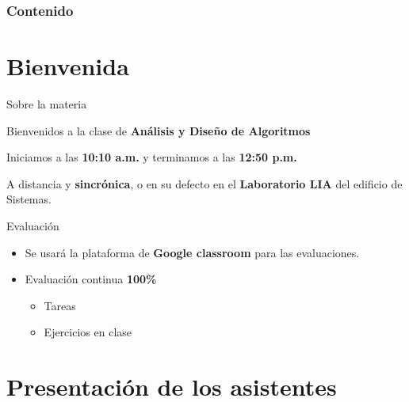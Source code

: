 \begin{frame}
    \frametitle{Contenido}
    \tableofcontents
\end{frame}

\section{Bienvenida}

\begin{frame}[c]{Sobre la materia}

  Bienvenidos a la clase de \textbf{Análisis y Diseño de Algoritmos}

  \vspace{\baselineskip}
  \begin{description}
    \pausa
    \item[Horario:] Iniciamos a las \textbf{10:10 a.m.} y terminamos a las
      \textbf{12:50 p.m.}
    \pausa
    \item[Modalidad:] A distancia y \textbf{sincrónica}, o en su defecto
      en el \textbf{Laboratorio LIA} del edificio de Sistemas.
  \end{description}
\end{frame}

\begin{frame}[c]{Evaluación}
  \begin{itemize}
    \item Se usará la plataforma de \textbf{Google classroom} para las
      evaluaciones.
    \pausa
    \item Evaluación continua \textbf{100\%}
    \pausa
    \begin{itemize}
      \item Tareas
      \pausa
      \item Ejercicios en clase
    \end{itemize}
  \end{itemize}
\end{frame}

\section{Presentación de los asistentes}


